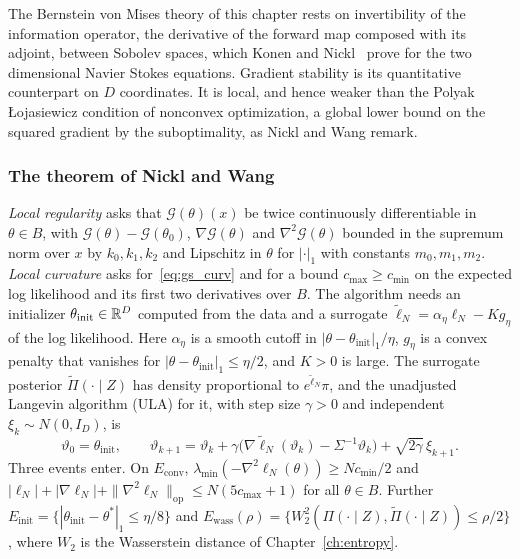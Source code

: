 The Bernstein von Mises theory of this chapter rests on invertibility of the information operator, the derivative of the forward map composed with its adjoint, between Sobolev spaces, which Konen and Nickl~\cite{konennickl2026} prove for the two dimensional Navier Stokes equations. Gradient stability is its quantitative counterpart on $D$ coordinates. It is local, and hence weaker than the Polyak \L{}ojasiewicz condition of nonconvex optimization, a global lower bound on the squared gradient by the suboptimality, as Nickl and Wang remark.

\subsubsection{The theorem of Nickl and Wang} \emph{Local regularity} asks that $\mathcal{G}(\theta)(x)$ be twice continuously differentiable in $\theta\in B$, with $\mathcal{G}(\theta)-\mathcal{G}(\theta_0)$, $\nabla\mathcal{G}(\theta)$ and $\nabla^2\mathcal{G}(\theta)$ bounded in the supremum norm over $x$ by $k_0,k_1,k_2$ and Lipschitz in $\theta$ for $|\cdot|_1$ with constants $m_0,m_1,m_2$. \emph{Local curvature} asks for~\eqref{eq:gs_curv} and for a bound $c_{\max}\ge c_{\min}$ on the expected log likelihood and its first two derivatives over $B$. The algorithm needs an initializer $\theta_{\mathrm{init}}\in\mathbb{R}^D$ computed from the data and a surrogate $\tilde\ell_N=\alpha_\eta\ell_N-Kg_\eta$ of the log likelihood. Here $\alpha_\eta$ is a smooth cutoff in $|\theta-\theta_{\mathrm{init}}|_1/\eta$, $g_\eta$ is a convex penalty that vanishes for $|\theta-\theta_{\mathrm{init}}|_1\le\eta/2$, and $K>0$ is large. The surrogate posterior $\tilde\Pi(\cdot\mid Z)$ has density proportional to $e^{\tilde\ell_N}\pi$, and the unadjusted Langevin algorithm (ULA) for it, with step size $\gamma>0$ and independent $\xi_k\sim N(0,I_D)$, is
\begin{equation}\label{eq:gs_ula}
\vartheta_0=\theta_{\mathrm{init}},\qquad\vartheta_{k+1}=\vartheta_k+\gamma\big(\nabla\tilde\ell_N(\vartheta_k)-\Sigma^{-1}\vartheta_k\big)+\sqrt{2\gamma}\,\xi_{k+1}.
\end{equation}
Three events enter. On $E_{\mathrm{conv}}$, $\lambda_{\min}(-\nabla^2\ell_N(\theta))\ge Nc_{\min}/2$ and $|\ell_N|+|\nabla\ell_N|+\|\nabla^2\ell_N\|_{\mathrm{op}}\le N(5c_{\max}+1)$ for all $\theta\in B$. Further $E_{\mathrm{init}}=\{|\theta_{\mathrm{init}}-\theta^*|_1\le\eta/8\}$ and $E_{\mathrm{wass}}(\rho)=\{W_2^2(\Pi(\cdot\mid Z),\tilde\Pi(\cdot\mid Z))\le\rho/2\}$, where $W_2$ is the Wasserstein distance of Chapter~\ref{ch:entropy}.

